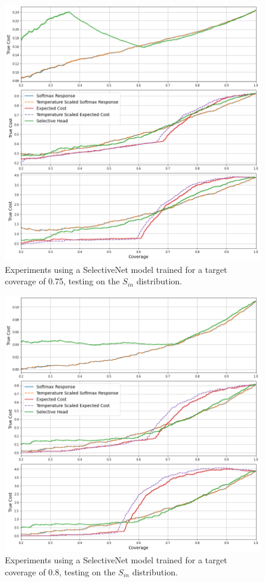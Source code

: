 \begin{figure}[H]
	\includegraphics[width=\textwidth]{images/binary/sn0.75_combine_distribution.png}
	\caption*{Experiments using a SelectiveNet model trained for a target coverage of 0.75, testing on the $S_{in}$ distribution.}
\end{figure}

\begin{figure}[H]
	\includegraphics[width=\textwidth]{images/binary/sn0.8_in_distribution.png}
	\caption*{Experiments using a SelectiveNet model trained for a target coverage of 0.8, testing on the $S_{in}$ distribution.}
\end{figure}

